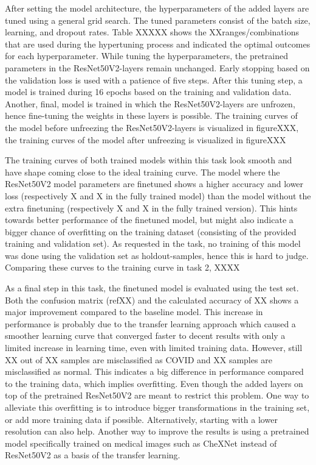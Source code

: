 \documentclass[conference]{IEEEtran}
\begin{document}
After setting the model architecture, the hyperparameters of the added layers are tuned using a general grid search. The tuned parameters consist of the  batch size, learning, and dropout rates. Table XXXXX shows the XXranges/combinations that are used during the hypertuning process and indicated the optimal outcomes for each hyperparameter. 
While tuning the hyperparameters, the pretrained parameters in the ResNet50V2-layers remain unchanged. Early stopping based on the validation loss is used with a patience of five steps. After this tuning step, a model is trained during 16 epochs based on the training and validation data. 
Another, final, model is trained in which the ResNet50V2-layers are unfrozen, hence fine-tuning the weights in these layers is possible. The training curves of the model before unfreezing the ResNet50V2-layers is visualized in figureXXX, the training curves of the model after unfreezing is visualized in figureXXX

The training curves of both trained models within this task look smooth and have shape coming close to the ideal training curve. 
The model where the ResNet50V2 model parameters are finetuned shows a higher accuracy and lower loss (respectively X and X in the fully trained model) than the model without the extra finetuning (respectively X and X in the fully trained version).
This hints towards better performance of the finetuned model, but might also indicate a bigger chance of overfitting on the training dataset (consisting of the provided training and validation set). As requested in the task, no training of this model was done using the validation set as holdout-samples, hence this is hard to judge.
Comparing these curves to the training curve in task 2, XXXX

As a final step in this task, the finetuned model is evaluated using the test set. Both the confusion matrix (refXX) and the calculated accuracy of XX shows a major improvement compared to the baseline model. 
This increase in performance is probably due to the transfer learning approach which caused a smoother learning curve that converged faster to decent results with only a limited increase in learning time, even with limited training data. 
However, still XX out of XX samples are misclassified as COVID and XX samples are misclassified as normal.
This indicates a big difference in performance compared to the training data, which implies overfitting. Even though the added layers on top of the pretrained ResNet50V2 are meant to restrict this problem. 
One way to alleviate this overfitting is to introduce bigger transformations in the training set, or add more training data if possible. Alternatively, starting with a lower resolution can also help.
Another way to improve the results is using a pretrained model specifically trained on medical images such as CheXNet instead of ResNet50V2 as a basis of the transfer learning.
\end{document}

